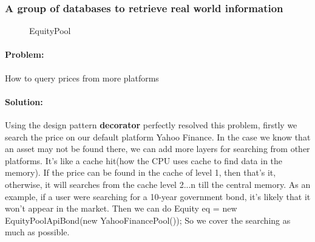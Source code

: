 \documentclass[a4paper,12pt]{report}
\begin{document}
\subsubsection*{A group of databases to retrieve real world information}
\begin{figure}[H]
	\centering{}
	\caption{EquityPool}
	\label{img:EquityPool}
	\end{figure}

	\paragraph{Problem:} How to query prices from more platforms

	\paragraph*{Solution:}Using the design pattern \textbf{decorator} perfectly resolved this problem, firstly we search the price on our default platform Yahoo Finance. In the case we know that an asset may not be found there, we can add more layers for searching from other platforms. It's like a cache hit(how the CPU uses cache to find data in the memory). If the price can be found in the cache of level 1, then that's it, otherwise, it will searches from the cache level 2...n till the central memory. 
	As an example, if a user were searching for a 10-year government bond, it's likely that it won't appear in the market. Then we can do Equity eq = new EquityPoolApiBond(new YahooFinancePool());  So we cover the searching as much as possible.
\end{document}
